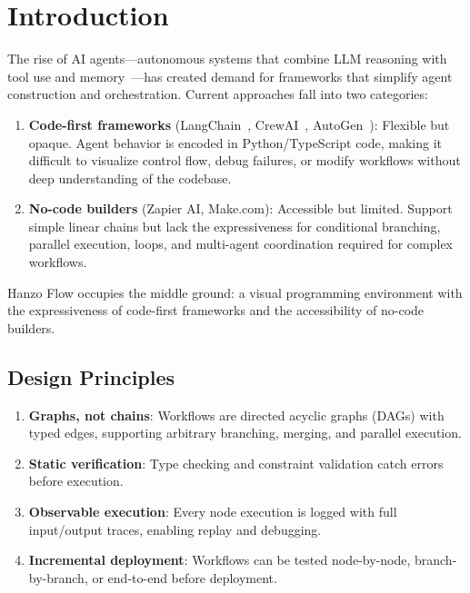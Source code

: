 \section{Introduction}

\label{sec:intro}

The rise of AI agents---autonomous systems that combine LLM reasoning with tool use and memory~\cite{wang2024survey,xi2023rise}---has created demand for frameworks that simplify agent construction and orchestration. Current approaches fall into two categories:

\begin{enumerate}[leftmargin=1.4em]
    \item \textbf{Code-first frameworks} (LangChain~\cite{langchain2023}, CrewAI~\cite{crewai2024}, AutoGen~\cite{wu2023autogen}): Flexible but opaque. Agent behavior is encoded in Python/TypeScript code, making it difficult to visualize control flow, debug failures, or modify workflows without deep understanding of the codebase.
    \item \textbf{No-code builders} (Zapier AI, Make.com): Accessible but limited. Support simple linear chains but lack the expressiveness for conditional branching, parallel execution, loops, and multi-agent coordination required for complex workflows.
\end{enumerate}

Hanzo Flow occupies the middle ground: a visual programming environment with the expressiveness of code-first frameworks and the accessibility of no-code builders.

\subsection{Design Principles}

\begin{enumerate}[leftmargin=1.4em]
    \item \textbf{Graphs, not chains}: Workflows are directed acyclic graphs (DAGs) with typed edges, supporting arbitrary branching, merging, and parallel execution.
    \item \textbf{Static verification}: Type checking and constraint validation catch errors before execution.
    \item \textbf{Observable execution}: Every node execution is logged with full input/output traces, enabling replay and debugging.
    \item \textbf{Incremental deployment}: Workflows can be tested node-by-node, branch-by-branch, or end-to-end before deployment.
\end{enumerate}

